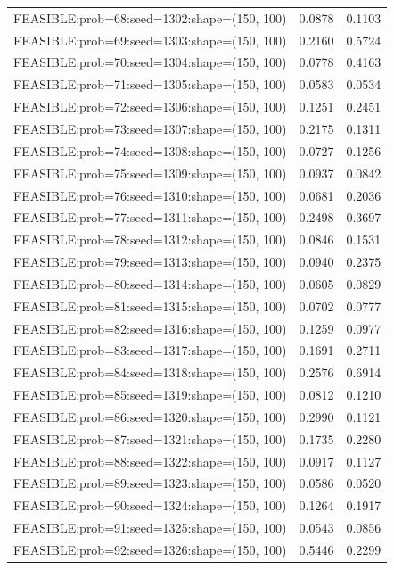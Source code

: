\begin{longtable}{lcc}
FEASIBLE:prob=68:seed=1302:shape=(150, 100)  &   0.0878 & 0.1103 \\
FEASIBLE:prob=69:seed=1303:shape=(150, 100)  &   0.2160 & 0.5724 \\
FEASIBLE:prob=70:seed=1304:shape=(150, 100)  &   0.0778 & 0.4163 \\
FEASIBLE:prob=71:seed=1305:shape=(150, 100)  &   0.0583 & 0.0534 \\
FEASIBLE:prob=72:seed=1306:shape=(150, 100)  &   0.1251 & 0.2451 \\
FEASIBLE:prob=73:seed=1307:shape=(150, 100)  &   0.2175 & 0.1311 \\
FEASIBLE:prob=74:seed=1308:shape=(150, 100)  &   0.0727 & 0.1256 \\
FEASIBLE:prob=75:seed=1309:shape=(150, 100)  &   0.0937 & 0.0842 \\
FEASIBLE:prob=76:seed=1310:shape=(150, 100)  &   0.0681 & 0.2036 \\
FEASIBLE:prob=77:seed=1311:shape=(150, 100)  &   0.2498 & 0.3697 \\
FEASIBLE:prob=78:seed=1312:shape=(150, 100)  &   0.0846 & 0.1531 \\
FEASIBLE:prob=79:seed=1313:shape=(150, 100)  &   0.0940 & 0.2375 \\
FEASIBLE:prob=80:seed=1314:shape=(150, 100)  &   0.0605 & 0.0829 \\
FEASIBLE:prob=81:seed=1315:shape=(150, 100)  &   0.0702 & 0.0777 \\
FEASIBLE:prob=82:seed=1316:shape=(150, 100)  &   0.1259 & 0.0977 \\
FEASIBLE:prob=83:seed=1317:shape=(150, 100)  &   0.1691 & 0.2711 \\
FEASIBLE:prob=84:seed=1318:shape=(150, 100)  &   0.2576 & 0.6914 \\
FEASIBLE:prob=85:seed=1319:shape=(150, 100)  &   0.0812 & 0.1210 \\
FEASIBLE:prob=86:seed=1320:shape=(150, 100)  &   0.2990 & 0.1121 \\
FEASIBLE:prob=87:seed=1321:shape=(150, 100)  &   0.1735 & 0.2280 \\
FEASIBLE:prob=88:seed=1322:shape=(150, 100)  &   0.0917 & 0.1127 \\
FEASIBLE:prob=89:seed=1323:shape=(150, 100)  &   0.0586 & 0.0520 \\
FEASIBLE:prob=90:seed=1324:shape=(150, 100)  &   0.1264 & 0.1917 \\
FEASIBLE:prob=91:seed=1325:shape=(150, 100)  &   0.0543 & 0.0856 \\
FEASIBLE:prob=92:seed=1326:shape=(150, 100)  &   0.5446 & 0.2299 \\

\end{longtable}
